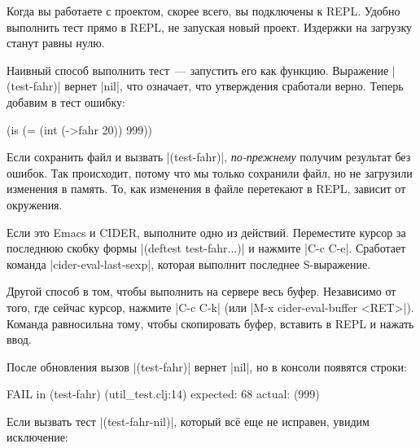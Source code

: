 Когда вы работаете с проектом, скорее всего, вы подключены к REPL. Удобно
выполнить тест прямо в REPL, не запуская новый проект. Издержки на загрузку
станут равны нулю.

Наивный способ выполнить тест~--- запустить его как функцию. Выражение
\spverb|(test-fahr)| вернет \spverb|nil|, что означает, что утверждения
сработали верно. Теперь добавим в тест ошибку:

\begin{english}
  \begin{clojure}
(is (= (int (->fahr 20)) 999))
  \end{clojure}
\end{english}

Если сохранить файл и вызвать \spverb|(test-fahr)|, \emph{по-прежнему} получим
результат без ошибок. Так происходит, потому что мы только сохранили файл, но не
загрузили изменения в память. То, как изменения в файле перетекают в REPL,
зависит от окружения.

Если это Emacs и CIDER, выполните одно из действий. Переместите курсор за
последнюю скобку формы \spverb|(deftest test-fahr...)| и нажмите \spverb|C-c C-e|.
Сработает команда \spverb|cider-eval-last-sexp|, которая выполнит последнее S-выражение.

Другой способ в том, чтобы выполнить на сервере весь буфер. Независимо от того,
где сейчас курсор, нажмите \spverb|C-c C-k| (или \spverb|M-x cider-eval-buffer <RET>|).
Команда равносильна тому, чтобы скопировать буфер, вставить в REPL и нажать ввод.

После обновления вызов \spverb|(test-fahr)| вернет \spverb|nil|, но в консоли
появятся строки:

\begin{english}
  \begin{clojure}
FAIL in (test-fahr) (util_test.clj:14)
expected: 68
  actual: (999)
  \end{clojure}
\end{english}

Если вызвать тест \spverb|(test-fahr-nil)|, который вс\"{е} еще не исправен,
увидим исключение:

\begin{english}
\end{english}

